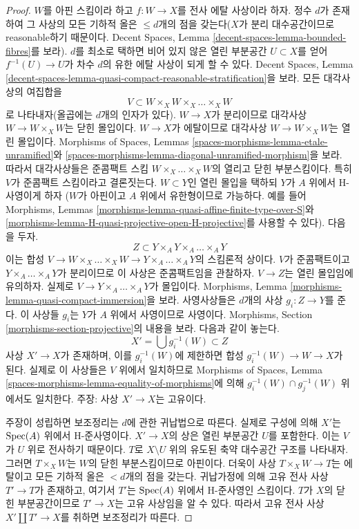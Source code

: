 \begin{proof}
$W$를 아핀 스킴이라 하고 $f : W \to X$를 전사 에탈 사상이라 하자.
정수 $d$가 존재하여 그 사상의 모든 기하적 올은 $\leq d$개의 점을
갖는다($X$가 분리 대수공간이므로 reasonable하기 때문이다. Decent
Spaces, Lemma \ref{decent-spaces-lemma-bounded-fibres}를 보라).
$d$를 최소로 택하면 비어 있지 않은 열린 부분공간 $U \subset X$를
얻어 $f^{-1}(U) \to U$가 차수 $d$의 유한 에탈 사상이 되게 할 수 있다.
Decent Spaces, Lemma
\ref{decent-spaces-lemma-quasi-compact-reasonable-stratification}을 보라.
모든 대각사상의 여집합을
$$
V \subset W \times_X W \times_X \ldots \times_X W
$$
로 나타내자(올곱에는 $d$개의 인자가 있다). $W \to X$가 분리이므로
대각사상 $W \to W \times_X W$는 닫힌 몰입이다. $W \to X$가
에탈이므로 대각사상 $W \to W \times_X W$는 열린 몰입이다.
Morphisms of Spaces, Lemmas
\ref{spaces-morphisms-lemma-etale-unramified}와
\ref{spaces-morphisms-lemma-diagonal-unramified-morphism}을 보라. 따라서
대각사상들은 준콤팩트 스킴 $W \times_X \ldots \times_X W$의 열리고
닫힌 부분스킴이다. 특히 $V$가 준콤팩트 스킴이라고 결론짓는다.
$W \subset Y$인 열린 몰입을 택하되 $Y$가 $A$ 위에서 H-사영이게 하자
($W$가 아핀이고 $A$ 위에서 유한형이므로 가능하다. 예를 들어 Morphisms,
Lemmas \ref{morphisms-lemma-quasi-affine-finite-type-over-S}와
\ref{morphisms-lemma-H-quasi-projective-open-H-projective}를 사용할 수 있다).
다음을 두자.
$$
Z \subset Y \times_A Y \times_A \ldots \times_A Y
$$
이는 합성
$V \to W \times_X \ldots \times_X W \to
Y \times_A \ldots \times_A Y$의 스킴론적 상이다.
$V$가 준콤팩트이고 $Y \times_A \ldots \times_A Y$가
분리이므로 이 사상은 준콤팩트임을 관찰하자. $V \to Z$는 열린
몰입임에 유의하자. 실제로
$V \to Y \times_A \ldots \times_A Y$가 몰입이다. Morphisms, Lemma
\ref{morphisms-lemma-quasi-compact-immersion}을 보라. 사영사상들은
$d$개의 사상 $g_i : Z \to Y$를 준다. 이 사상들 $g_i$는 $Y$가
$A$ 위에서 사영이므로 사영이다. Morphisms, Section
\ref{morphisms-section-projective}의 내용을 보라. 다음과 같이 놓는다.
$$
X' = \bigcup g_i^{-1}(W) \subset Z
$$
사상 $X' \to X$가 존재하며, 이를 $g_i^{-1}(W)$에 제한하면 합성
$g_i^{-1}(W) \to W \to X$가 된다. 실제로 이 사상들은 $V$ 위에서
일치하므로 Morphisms of Spaces, Lemma
\ref{spaces-morphisms-lemma-equality-of-morphisms}에 의해
$g_i^{-1}(W) \cap g_j^{-1}(W)$ 위에서도 일치한다. 주장: 사상
$X' \to X$는 고유이다.

\medskip\noindent
주장이 성립하면 보조정리는 $d$에 관한 귀납법으로 따른다. 실제로
구성에 의해 $X'$는 $\mathop{\mathrm{Spec}}(A)$ 위에서 H-준사영이다. $X' \to X$의
상은 열린 부분공간 $U$를 포함한다. 이는 $V$가 $U$ 위로 전사하기
때문이다.
$T$로 $X \setminus U$ 위의 유도된 축약 대수공간 구조를 나타내자.
그러면 $T \times_X W$는 $W$의 닫힌 부분스킴이므로 아핀이다. 더욱이
사상 $T \times_X W \to T$는 에탈이고 모든 기하적 올은 $< d$개의
점을 갖는다. 귀납가정에 의해 고유 전사 사상 $T' \to T$가 존재하고,
여기서 $T'$는 $\mathop{\mathrm{Spec}}(A)$ 위에서 H-준사영인 스킴이다. $T$가 $X$의
닫힌 부분공간이므로 $T' \to X$는 고유 사상임을 알 수 있다. 따라서
고유 전사 사상 $X' \amalg T' \to X$를 취하면 보조정리가 따른다.


\end{proof}
